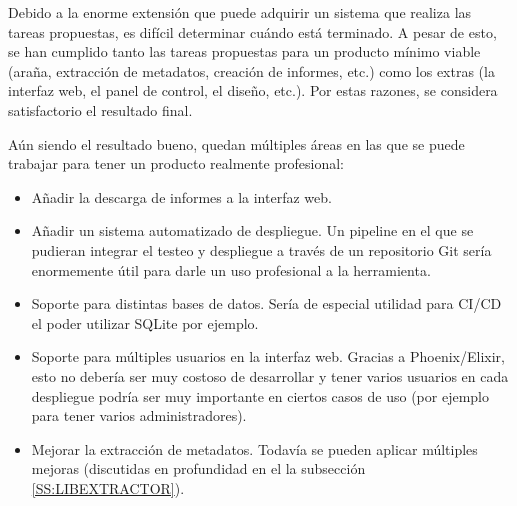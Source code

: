 Debido a la enorme extensión que puede adquirir un sistema que realiza las tareas propuestas, es difícil determinar cuándo está terminado. A pesar de esto, se han cumplido tanto las tareas propuestas para un producto mínimo viable (araña, extracción de metadatos, creación de informes, etc.) como los extras (la interfaz web, el panel de control, el diseño, etc.). Por estas razones, se considera satisfactorio el resultado final.

Aún siendo el resultado bueno, quedan múltiples áreas en las que se puede trabajar para tener un producto realmente profesional:

\begin{itemize}
  \item Añadir la descarga de informes a la interfaz web.
  \item Añadir un sistema automatizado de despliegue. Un pipeline en el que se pudieran integrar el testeo y despliegue a través de un repositorio Git sería enormemente útil para darle un uso profesional a la herramienta.
  \item Soporte para distintas bases de datos. Sería de especial utilidad para CI/CD el poder utilizar SQLite por ejemplo.
  \item Soporte para múltiples usuarios en la interfaz web. Gracias a Phoenix/Elixir, esto no debería ser muy costoso de desarrollar y tener varios usuarios en cada despliegue podría ser muy importante en ciertos casos de uso (por ejemplo para tener varios administradores).
  \item Mejorar la extracción de metadatos. Todavía se pueden aplicar múltiples mejoras (discutidas en profundidad en el la subsección \ref{SS:LIBEXTRACTOR}).
\end{itemize}